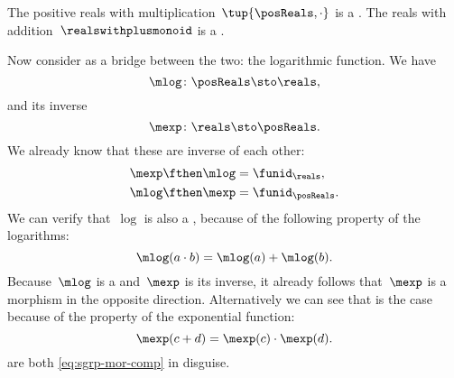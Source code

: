 \begin{example}
    The positive reals with multiplication~$\tup{\posReals, \cdot}$ is a .
    The reals with addition~$\realswithplusmonoid$ is a .

    Now consider as a bridge between the two: the logarithmic function.
    We have
    \begin{equation}
        \label{eq:log}
        \mlog \colon \posReals \sto \reals,
    \end{equation}
    and its inverse
    \begin{equation}
        \label{eq:exp}
        \mexp \colon \reals \sto \posReals.
    \end{equation}
    We already know that these are inverse of each other:
    \begin{equation}
        \label{eq:exp-log-are-inverses}
        \begin{aligned}
            \mexp \fthen \mlog & = \funid_{\reals}, \\
            \mlog \fthen \mexp & = \funid_{\posReals}.
        \end{aligned}
    \end{equation}
    We can verify that~$\log$ is also a , because of the following property of the logarithms:
    \begin{equation}
        \label{eq:log-property}
        \mlog(a \cdot b) = \mlog(a) + \mlog(b).
    \end{equation}
    Because~$\mlog$ is a  and~$\mexp$ is its inverse, it already follows that~$\mexp$ is a morphism in the opposite direction.
    Alternatively we can see that is the case because of the property of the exponential function:
    \begin{equation}
        \label{eq:exp-property}
        \mexp(c + d) = \mexp(c) \cdot \mexp(d).
    \end{equation}
     are both \cref{eq:sgrp-mor-comp} in disguise.
\end{example}

